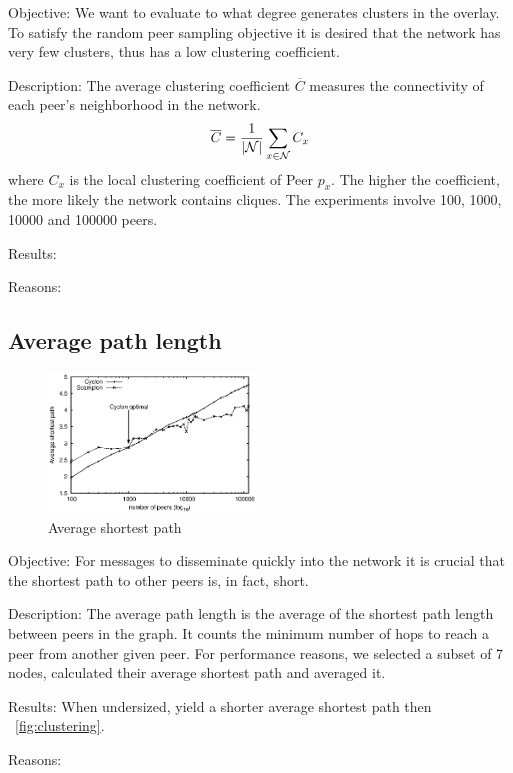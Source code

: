 \begin{asparadesc}
\item[Objective:]
    We want to evaluate to what degree \SCAMPLON{} generates clusters in the overlay.
    To satisfy the random peer sampling objective it is desired that the network has very few clusters,
    thus has a low clustering coefficient.
\item[Description:] 
    The average clustering coefficient $\overline{C}$  measures the connectivity of each peer's neighborhood in the network.
  \begin{equation}
    \overline{C} = {1\over |\mathcal{N}|}\sum\limits_{x\in\mathcal{N}}C_x
    \end{equation}
    where $C_x$ is the local clustering coefficient of Peer $p_x$. The higher
    the coefficient, the more likely the network contains cliques. 
    The experiments involve 100, 1000, 10000 and 100000 peers. 


\item[Results:]



\item[Reasons:]

    

\end{asparadesc}



\subsection{Average path length}

\begin{figure}
    \centering
    \includegraphics[width=0.49\textwidth]{img/avgpath.eps}
    \caption{Average shortest path}
    \label{fig:avgpath}
\end{figure}

\begin{asparadesc}
\item[Objective:] 
    For messages to disseminate quickly into the network it is crucial 
    that the shortest path to other peers is, in fact, short.
\item[Description:] The average path length is the average of the shortest path
  length between peers in the graph. It counts the minimum number of hops to
  reach a peer from another given peer.
  For performance reasons, we selected a subset of 7 nodes, calculated their
  average shortest path and averaged it.
\item[Results:]
When undersized, \CYCLON{} yield a shorter average shortest path then \SCAMPLON{}~\ref{fig:clustering}.
\item[Reasons:]
\end{asparadesc}

